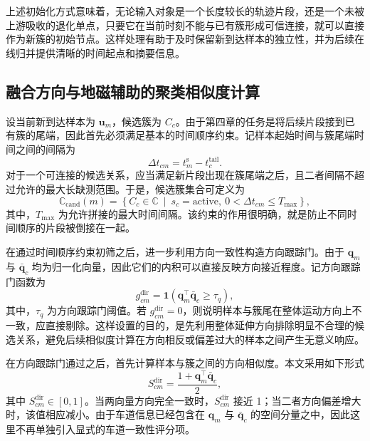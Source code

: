 \documentclass{xdupgthesis}
\begin{document}
上述初始化方式意味着，无论输入对象是一个长度较长的轨迹片段，还是一个未被上游吸收的退化单点，只要它在当前时刻不能与已有簇形成可信连接，就可以直接作为新簇的初始节点。这样处理有助于及时保留新到达样本的独立性，并为后续在线归并提供清晰的时间起点和摘要信息。


\subsection{融合方向与地磁辅助的聚类相似度计算}

设当前新到达样本为 $\mathbf{u}_m$，候选簇为 $C_c$。由于第四章的任务是将后续片段接到已有簇的尾端，因此首先必须满足基本的时间顺序约束。记样本起始时间与簇尾端时间之间的间隔为
\begin{equation}
	\Delta t_{cm}=t_m^{\mathrm{s}}-t_c^{\mathrm{tail}}.
\end{equation}
对于一个可连接的候选关系，应当满足新片段出现在簇尾端之后，且二者间隔不超过允许的最大长缺测范围。于是，候选簇集合可定义为
\begin{equation}
	\mathbb{C}_{\mathrm{cand}}(m)=
	\left\{
	C_c\in\mathbb{C}\ \middle|\ s_c=\mathrm{active},\ 0<\Delta t_{cm}\le T_{\max}
	\right\},
\end{equation}
其中，$T_{\max}$ 为允许拼接的最大时间间隔。该约束的作用很明确，就是防止不同时间顺序的片段被倒接在一起。

在通过时间顺序约束初筛之后，进一步利用方向一致性构造方向跟踪门。由于 $\mathbf{q}_m$ 与 $\bar{\mathbf{q}}_c$ 均为归一化向量，因此它们的内积可以直接反映方向接近程度。记方向跟踪门函数为
\begin{equation}
	g_{cm}^{\mathrm{dir}}=
	\mathbf{1}
	\left(
	\mathbf{q}_m^{\top}\bar{\mathbf{q}}_c\ge \tau_q
	\right),
\end{equation}
其中，$\tau_q$ 为方向跟踪门阈值。若 $g_{cm}^{\mathrm{dir}}=0$，则说明样本与簇尾在整体运动方向上不一致，应直接剔除。这样设置的目的，是先利用整体延伸方向排除明显不合理的候选关系，避免后续相似度计算在方向相反或偏差过大的样本之间产生无意义响应。

在方向跟踪门通过之后，首先计算样本与簇之间的方向相似度。本文采用如下形式
\begin{equation}
	S_{cm}^{\mathrm{dir}}=
	\frac{1+\mathbf{q}_m^{\top}\bar{\mathbf{q}}_c}{2},
\end{equation}
其中 $S_{cm}^{\mathrm{dir}}\in[0,1]$。当两向量方向完全一致时，$S_{cm}^{\mathrm{dir}}$ 接近 1；当二者方向偏差增大时，该值相应减小。由于车道信息已经包含在 $\mathbf{q}_m$ 与 $\bar{\mathbf{q}}_c$ 的空间分量之中，因此这里不再单独引入显式的车道一致性评分项。
\end{document}
